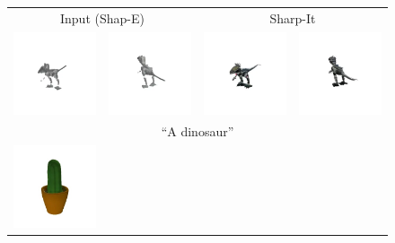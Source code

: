 
\begin{figure}
    \centering
    \setlength{\tabcolsep}{1pt}
    {\small
    \begin{tabular}{cccc}
        \multicolumn{2}{c}{Input (Shap-E)} & \multicolumn{2}{c}{Sharp-It} \\
    
        \multicolumn{1}{c}{\includegraphics[width=0.24\linewidth, trim=50 0 50 0, clip]{images/supplementary/failure_cases/dino-shap-e-1.png}} &
        \includegraphics[width=0.24\linewidth, trim=50 0 50 0, clip]{images/supplementary/failure_cases/dino-shap-e-2.png} &
        \includegraphics[width=0.24\linewidth, trim=50 0 50 0, clip]{images/supplementary/failure_cases/dino-sharp-it-1.png} &
        \includegraphics[width=0.24\linewidth, trim=50 0 50 0, clip]{images/supplementary/failure_cases/dino-sharp-it-2.png} \\
        \multicolumn{4}{c}{``A dinosaur''} \\
        \multicolumn{1}{c}{\includegraphics[width=0.24\linewidth, trim=50 0 50 0, clip]{images/supplementary/failure_cases/image-16_r1c1.jpg}} &

\end{tabular}}
\end{figure}

